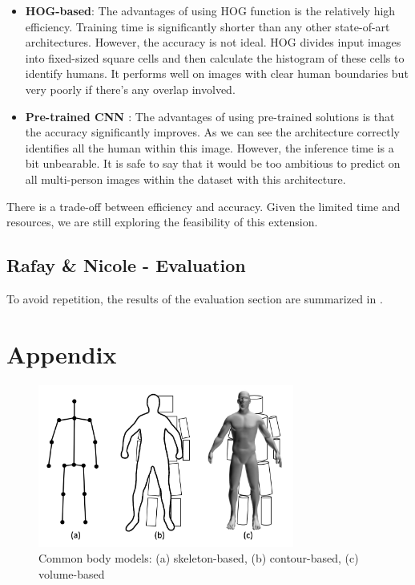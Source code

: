 \documentclass[11pt, letterpaper]{article}
\begin{document}
\begin{itemize}
    \item \textbf{HOG-based}: 
    The advantages of using HOG function is the relatively high efficiency. Training time is significantly shorter than any other state-of-art architectures. However, the accuracy is not ideal. HOG divides input images into fixed-sized square cells and then calculate the histogram of these cells to identify humans. It performs well on images with clear human boundaries but very poorly if there’s any overlap involved.	
    \item \textbf{Pre-trained CNN \cite{pre_trained_architecture}}: 
    The advantages of using pre-trained solutions is that the accuracy significantly improves. As we can see the architecture correctly identifies all the human within this image. However, the inference time is a bit unbearable. It is safe to say that it would be too ambitious to predict on all multi-person images within the dataset with this architecture. 
\end{itemize}

There is a trade-off between efficiency and accuracy. Given the limited time and resources, we are still exploring the feasibility of this extension.


\subsection{Rafay \& Nicole - Evaluation}
To avoid repetition, the results of the evaluation section are summarized in .

\clearpage




\clearpage
\section{Appendix}

\begin{figure}[h]
    \centering
    \includegraphics[width=0.75\textwidth]{body_models.png}
    \caption{Common body models: (a) skeleton-based, (b) contour-based, (c) volume-based \cite{Chen_2020}}
    \label{fig:body_model}
\end{figure}
\end{document}
